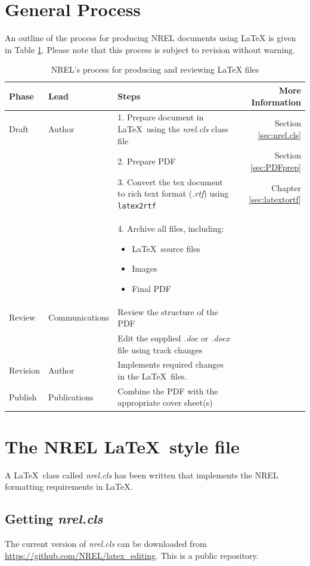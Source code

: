 \documentclass[12pt,letterpaper]{report}
\begin{document}
\section{General Process}
An outline of the process for producing NREL documents using \LaTeX{} is given in Table \ref{Tab:NRELprocess}. Please note that this process is subject to revision without warning.

\begin{table}[!h]
\centering
\caption{NREL's process for producing and reviewing \LaTeX{} files}
\label{Tab:NRELprocess}
\begin{tabular*}{\textwidth}{llp{}r}
\toprule
Phase & Lead & Steps & More Information \\
\midrule
Draft & Author & 1. Prepare document in \LaTeX\ using the \emph{nrel.cls} class file & Section \ref{sec:nrel.cls} \\
 & & 2. Prepare PDF & Section \ref{sec:PDFprep} \\
 & & 3. Convert the tex document to rich text format (\emph{.rtf}) using \texttt{latex2rtf} & Chapter \ref{sec:latextortf}\\
 & & 4. Archive all files, including:
\begin{itemize}  
 \item \LaTeX\ source files
 \item Images
 \item Final PDF 
 \end{itemize} & \\
Review & Communications & Review the structure of the PDF & \\
 & & Edit the supplied \emph{.doc} or \emph{.docx} file using track changes & \\
Revision & Author & Implements required changes in the \LaTeX\ files. & \\
Publish & Publications & Combine the PDF with the appropriate cover sheet(s) & \\
\bottomrule
\end{tabular*}
\end{table}

\section{The NREL \LaTeX\ style file\label{sec:nrel.cls}}
A \LaTeX\ class called \emph{nrel.cls} has been written that implements the NREL formatting requirements in \LaTeX.

\subsection{Getting \emph{nrel.cls}}
The current version of \emph{nrel.cls} can be downloaded from \url{https://github.com/NREL/latex_editing}. This is a public repository.
\end{document}
